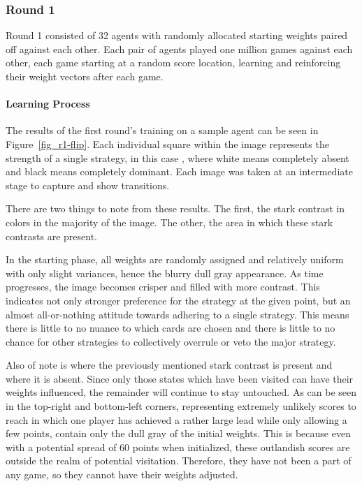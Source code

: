 

\subsubsection*{Round 1}
\label{sec:findings-r1}


Round 1 consisted of 32 agents with randomly allocated starting weights
paired off against each other.
%
Each pair of agents played one million games against each other,
each game starting at a random score location,
learning and reinforcing their weight vectors after each game.

\paragraph*{Learning Process}


The results of the first round's training on a sample agent can be seen
in Figure~\ref{fig_r1-flip}.
%
Each individual square within the image represents the strength of a single
strategy,
in this case \handmaxavg,
where white means completely absent and black means completely dominant.
%
Each image was taken at an intermediate stage to capture and show transitions.

There are two things to note from these results.
%
The first, the stark contrast in colors in the majority of the image.
%
The other, the area in which these stark contrasts are present.

In the starting phase,
all weights are randomly assigned and relatively uniform with only slight
variances,
hence the blurry dull gray appearance.
%
As time progresses,
the image becomes crisper and filled with more contrast.
%
This indicates not only stronger preference for the strategy at the given
point,
but an almost all-or-nothing attitude towards adhering to a single strategy.
%
This means there is little to no nuance to which cards are chosen
and there is little to no chance for other strategies to collectively overrule 
or veto the major strategy.

Also of note is where the previously mentioned stark contrast is present and
where it is absent.
%
Since only those states which have been visited can have their weights
influenced,
the remainder will continue to stay untouched.
%
As can be seen in the top-right and bottom-left corners,
representing extremely unlikely scores to reach in which one player has
achieved a rather large lead while only allowing a few points,
contain only the dull gray of the initial weights.
%
This is because even with a potential spread of 60 points when initialized,
these outlandish scores are outside the realm of potential visitation.
%
Therefore, they have not been a part of any game,
so they cannot have their weights adjusted.

